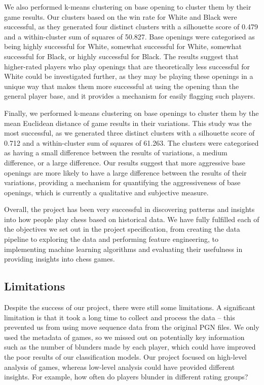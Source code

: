 \documentclass[a4paper, 11pt]{article}
\begin{document}
We also performed k-means clustering on base opening to cluster them by their game results. Our clusters based on the win rate for White and Black were successful, as they generated four distinct clusters with a silhouette score of 0.479 and a within-cluster sum of squares of 50.827. Base openings were categorised as being highly successful for White, somewhat successful for White, somewhat successful for Black, or highly successful for Black. The results suggest that higher-rated players who play openings that are theoretically less successful for White could be investigated further, as they may be playing these openings in a unique way that makes them more successful at using the opening than the general player base, and it provides a mechanism for easily flagging such players.

Finally, we performed k-means clustering on base openings to cluster them by the mean Euclidean distance of game results in their variations. This study was the most successful, as we generated three distinct clusters with a silhouette score of 0.712 and a within-cluster sum of squares of 61.263. The clusters were categorised as having a small difference between the results of variations, a medium difference, or a large difference. Our results suggest that more aggressive base openings are more likely to have a large difference between the results of their variations, providing a mechanism for quantifying the aggressiveness of base openings, which is currently a qualitative and subjective measure.

Overall, the project has been very successful in discovering patterns and insights into how people play chess based on historical data. We have fully fulfilled each of the objectives we set out in the project specification, from creating the data pipeline to exploring the data and performing feature engineering, to implementing machine learning algorithms and evaluating their usefulness in providing insights into chess games.

\subsection{Limitations}
Despite the success of our project, there were still some limitations. A significant limitation is that it took a long time to collect and process the data -- this prevented us from using move sequence data from the original PGN files. We only used the metadata of games, so we missed out on potentially key information such as the number of blunders made by each player, which could have improved the poor results of our classification models. Our project focused on high-level analysis of games, whereas low-level analysis could have provided different insights. For example, how often do players blunder in different rating groups?
\end{document}
